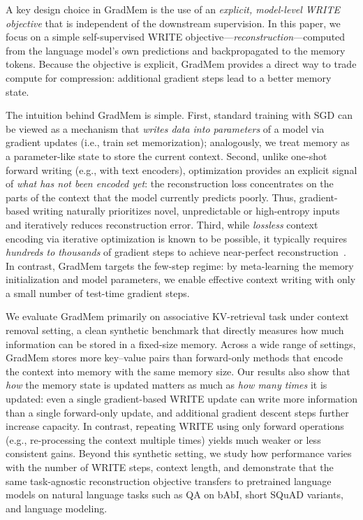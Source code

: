 \documentclass{article}
\theoremstyle{plain}
\theoremstyle{definition}
\theoremstyle{remark}
\begin{document}
A key design choice in GradMem is the use of an \emph{explicit, model-level WRITE objective} that is independent of the downstream supervision.
In this paper, we focus on a simple self-supervised WRITE objective---\emph{reconstruction}---computed from the language model's own predictions and backpropagated to the memory tokens.
Because the objective is explicit, GradMem provides a direct way to trade compute for compression: additional gradient steps lead to a better memory state.


The intuition behind GradMem is simple.
First, standard training with SGD can be viewed as a mechanism that \emph{writes data into parameters} of a model via gradient updates (i.e., train set memorization); analogously, we treat memory as a parameter-like state to store the current context.
Second, unlike one-shot forward writing (e.g., with text encoders), optimization provides an explicit signal of \emph{what has not been encoded yet}: the reconstruction loss concentrates on the parts of the context that the model currently predicts poorly.
Thus, gradient-based writing naturally prioritizes novel, unpredictable or high-entropy inputs and iteratively reduces reconstruction error.
Third, while \emph{lossless} context encoding via iterative optimization is known to be possible, it typically requires \emph{hundreds to thousands} of gradient steps to achieve near-perfect reconstruction~\citep{kuratov2025cramming}. In contrast, GradMem targets the few-step regime: by meta-learning the memory initialization and model parameters, we enable effective context writing with only a small number of test-time gradient steps.


We evaluate GradMem primarily on associative KV-retrieval task under context removal setting, a clean synthetic benchmark that directly measures how much information can be stored in a fixed-size memory.
Across a wide range of settings, GradMem stores more key--value pairs than forward-only methods that encode the context into memory with the same memory size.
Our results also show that \emph{how} the memory state is updated matters as much as \emph{how many times} it is updated: even a single gradient-based WRITE update can write more information than a single forward-only update, and additional gradient descent steps further increase capacity.
In contrast, repeating WRITE using only forward operations (e.g., re-processing the context multiple times) yields much weaker or less consistent gains.
Beyond this synthetic setting, we study how performance varies with the number of WRITE steps, context length, and demonstrate that the same task-agnostic reconstruction objective transfers to pretrained language models on natural language tasks such as QA on bAbI, short SQuAD variants, and language modeling.
\end{document}
